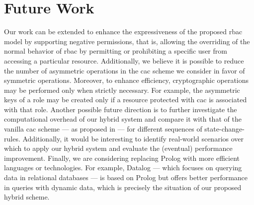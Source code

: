 \section{Future Work}
\label{sec:conclusion:futurework}

Our work can be extended to enhance the expressiveness of the proposed \gls{rbac} model by supporting negative permissions, that is, allowing the overriding of the normal behavior of \gls{rbac} by permitting or prohibiting a specific user from accessing a particular resource. 
Additionally, we believe it is possible to reduce the number of asymmetric operations in the \gls{cac} scheme we consider in favor of symmetric operations. Moreover, to enhance efficiency, cryptographic operations may be performed only when strictly necessary. For example, the asymmetric keys of a role may be created only if a resource protected with \gls{cac} is associated with that role. 
Another possible future direction is to further investigate the computational overhead of our hybrid system and compare it with that of the vanilla \gls{cac} scheme --- as proposed in \cite{cac} --- for different sequences of state-change-rules. Additionally, it would be interesting to identify real-world scenarios over which to apply our hybrid system and evaluate the (eventual) performance improvement.
Finally, we are considering replacing Prolog with more efficient languages or technologies. For example, Datalog --- which focuses on querying data in relational databases --- is based on Prolog but offers better performance in queries with dynamic data, which is precisely the situation of our proposed hybrid scheme. 
